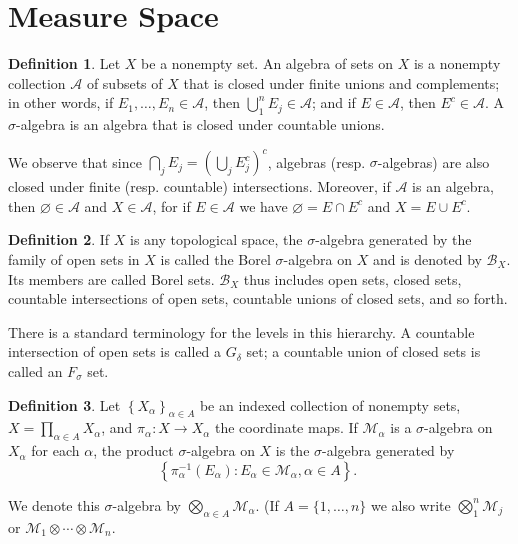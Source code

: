 \documentclass[12pt,a4paper]{book}
\theoremstyle{definition}
\newtheorem{defn}{Definition}[section]
\begin{document}
\section{Measure Space}
\begin{defn}
    Let $X$ be a nonempty set. An algebra of sets on $X$ is a nonempty collection $\mathcal{A}$ of subsets of $X$ that is closed under finite unions and complements; in other words, if $E_1, \ldots, E_n \in \mathcal{A}$, then $\bigcup_1^n E_j \in \mathcal{A}$; and if $E \in \mathcal{A}$, then $E^c \in \mathcal{A}$. A $\sigma$-algebra is an algebra that is closed under countable unions.

    We observe that since $\bigcap_j E_j=\left(\bigcup_j E_j^c\right)^c$, algebras (resp. $\sigma$-algebras) are also closed under finite (resp. countable) intersections. Moreover, if $\mathcal{A}$ is an algebra, then $\varnothing \in \mathcal{A}$ and $X \in \mathcal{A}$, for if $E \in \mathcal{A}$ we have $\varnothing=E \cap E^c$ and $X=E \cup E^c$.
\end{defn}
\begin{defn}
    If $X$ is any topological space, the $\sigma$-algebra generated by the family of open sets in $X$ is called the Borel $\sigma$-algebra on $X$ and is denoted by $\mathcal{B}_X$. Its members are called Borel sets. $\mathcal{B}_X$ thus includes open sets, closed sets, countable intersections of open sets, countable unions of closed sets, and so forth.

    There is a standard terminology for the levels in this hierarchy. A countable intersection of open sets is called a $G_{\delta}$ set; a countable union of closed sets is called an $F_{\sigma}$ set.
\end{defn}
\begin{defn}
    Let $\left\{X_\alpha\right\}_{\alpha \in A}$ be an indexed collection of nonempty sets, $X=\prod_{\alpha \in A} X_\alpha$, and $\pi_\alpha: X \rightarrow X_\alpha$ the coordinate maps. If $\mathcal{M}_\alpha$ is a $\sigma$-algebra on $X_\alpha$ for each $\alpha$, the product $\sigma$-algebra on $X$ is the $\sigma$-algebra generated by
    $$
        \left\{\pi_\alpha^{-1}\left(E_\alpha\right): E_\alpha \in \mathcal{M}_\alpha, \alpha \in A\right\} \text {. }
    $$

    We denote this $\sigma$-algebra by $\bigotimes_{\alpha \in A} \mathcal{M}_\alpha$. (If $A=\{1, \ldots, n\}$ we also write $\bigotimes_1^n \mathcal{M}_j$ or $\mathcal{M}_1 \otimes \cdots \otimes \mathcal{M}_n$.
\end{defn}
\end{document}
